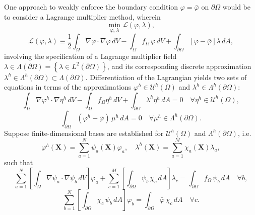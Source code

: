 	One approach to weakly enforce the boundary condition $\varphi = \bar{\varphi}$ on $\partial \Omega$ would be to consider a Lagrange multiplier method, wherein
	\begin{equation}
		\min_{\varphi, \, \lambda} \mathcal{L}(\varphi,\lambda),
	\end{equation}
	\begin{equation}
	\mathcal{L}(\varphi,\lambda) \equiv \frac{1}{2} \int_{\Omega} \nabla \varphi \cdot \nabla \varphi \, dV - \int_{\Omega} f_{\Omega} \, \varphi \, dV + \int_{\partial \Omega} \left[ \varphi - \bar{\varphi} \right] \lambda \, dA,
\end{equation}
	involving the specification of a Lagrange multiplier field $\lambda \in \Lambda (\partial \Omega) = \left\{ \lambda \in L^2 (\partial \Omega) \right\}$, and its corresponding discrete approximation $\lambda^h \in \Lambda^h (\partial \Omega) \subset \Lambda (\partial \Omega)$. Differentiation of the Lagrangian yields two sets of equations in terms of the approximations $\varphi^h \in \mathcal{U}^h (\Omega)$ and $\lambda^h \in \Lambda^h (\partial \Omega)$:
	\begin{equation}
		\int_{\Omega} \nabla \varphi^h \cdot \nabla \eta^h \, dV - \int_\Omega f_\Omega \eta^h \, dV + \int_{\partial \Omega} \lambda^h \eta^h \, dA = 0 \quad \forall \eta^h \in \mathcal{U}^h (\Omega),
	\end{equation}
	\begin{equation}
		\int_{\partial \Omega} (\varphi^h - \bar{\varphi}) \, \mu^h \, dA = 0 \quad \forall \mu^h \in \Lambda^h (\partial \Omega).
	\end{equation}
	Suppose finite-dimensional bases are established for $\mathcal{U}^h (\Omega)$ and $\Lambda^h (\partial \Omega)$, i.e.
\begin{equation}
	\varphi^h (\mathbf{X}) = \sum_{a=1}^{N} \psi_a (\mathbf{X}) \varphi_a, \quad \lambda^h (\mathbf{X}) = \sum_{a=1}^{M} \chi_a (\mathbf{X}) \lambda_a,
\end{equation}
such that
\begin{equation}
	\sum_{a=1}^N \left[ \int_{\Omega} \nabla \psi_a \cdot \nabla \psi_b \, dV \right] \varphi_a + \sum_{c=1}^M \left[ \int_{\partial \Omega} \psi_b \, \chi_c \, dA \right] \lambda_c = \int_{\partial \Omega} f_\Omega \, \psi_b \, dA \quad \forall b,
\end{equation}
\begin{equation}
	\sum_{b=1}^N \left[ \int_{\partial \Omega} \chi_c \, \psi_b \, dA \right] \varphi_b = \int_{\partial \Omega} \bar{\varphi} \, \chi_c \, dA \quad \forall c.
\end{equation}
